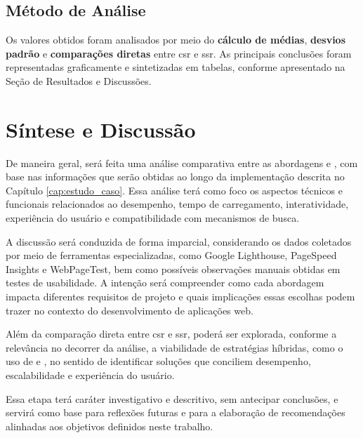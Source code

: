 \subsection{Método de Análise}

Os valores obtidos foram analisados por meio do \textbf{cálculo de médias}, \textbf{desvios padrão} e \textbf{comparações diretas} entre \acrshort{csr} e \acrshort{ssr}. As principais conclusões foram representadas graficamente e sintetizadas em tabelas, conforme apresentado na Seção de Resultados e Discussões.

\section{Síntese e Discussão}
\label{sec:sintese-e-discussao}

De maneira geral, será feita uma análise comparativa entre as abordagens  e , com base nas informações que serão obtidas ao longo da implementação descrita no Capítulo \ref{cap:estudo_caso}. Essa análise terá como foco os aspectos técnicos e funcionais relacionados ao desempenho, tempo de carregamento, interatividade, experiência do usuário e compatibilidade com mecanismos de busca.

A discussão será conduzida de forma imparcial, considerando os dados coletados por meio de ferramentas especializadas, como Google Lighthouse, PageSpeed Insights e WebPageTest, bem como possíveis observações manuais obtidas em testes de usabilidade. A intenção será compreender como cada abordagem impacta diferentes requisitos de projeto e quais implicações essas escolhas podem trazer no contexto do desenvolvimento de aplicações web.

Além da comparação direta entre {\acrshort{csr}} e {\acrshort{ssr}}, poderá ser explorada, conforme a relevância no decorrer da análise, a viabilidade de estratégias híbridas, como o uso de  e , no sentido de identificar soluções que conciliem desempenho, escalabilidade e experiência do usuário.

Essa etapa terá caráter investigativo e descritivo, sem antecipar conclusões, e servirá como base para reflexões futuras e para a elaboração de recomendações alinhadas aos objetivos definidos neste trabalho.
